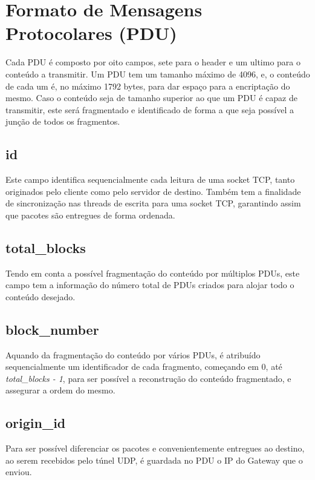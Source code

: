 \documentclass[a4paper]{report}
\begin{document}
\section{Formato de Mensagens Protocolares (PDU)}

Cada PDU é composto por oito campos, sete para o header e um ultimo
para o conteúdo a transmitir. Um PDU tem um tamanho máximo de 4096,
e, o conteúdo de cada um é, no máximo 1792 bytes, para dar espaço
para a encriptação do mesmo. Caso o conteúdo seja de tamanho 
superior ao que um PDU é capaz de transmitir, este será fragmentado
e identificado de forma a que seja possível a junção de todos os
fragmentos.

\subsection{id}

Este campo identifica sequencialmente cada leitura de uma socket TCP,
tanto originados pelo cliente como pelo servidor de destino. Também 
tem a finalidade de sincronização nas threads de escrita para uma
socket TCP, garantindo assim que pacotes são entregues de forma ordenada.

\subsection{total\_blocks}

Tendo em conta a possível fragmentação do conteúdo por múltiplos PDUs,
este campo tem a informação do número total de PDUs criados para alojar
todo o conteúdo desejado.

\subsection{block\_number}

Aquando da fragmentação do conteúdo por vários PDUs, é atribuído sequencialmente
um identificador de cada fragmento, começando em 0, até \textit{total\_blocks
- 1}, para ser possível a reconstrução do conteúdo fragmentado, e assegurar
a ordem do mesmo.

\subsection{origin\_id}

Para ser possível diferenciar os pacotes e convenientemente entregues ao 
destino, ao serem recebidos pelo túnel UDP, é guardada no PDU o IP do 
Gateway que o enviou.
\end{document}
